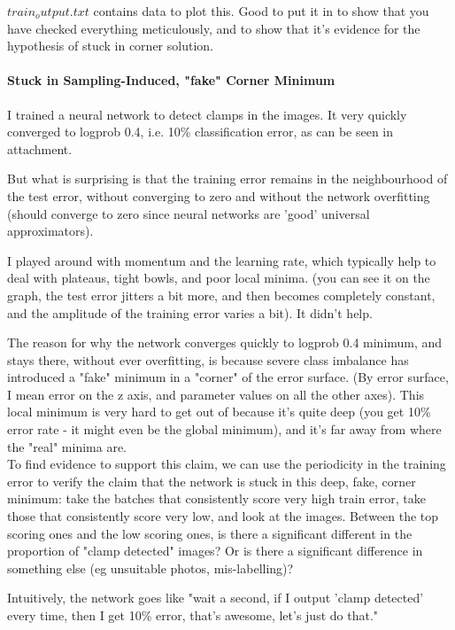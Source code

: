\documentclass[a4paper,11pt]{article}
\begin{document}
$train_output.txt$ contains data to plot this. Good to put it in to show that you have checked everything meticulously, and to show that it's evidence for the hypothesis of stuck in corner solution.


\paragraph{Stuck in Sampling-Induced, "fake" Corner Minimum}

I trained a neural network to detect clamps in the images. It very quickly converged to logprob 0.4, i.e. 10\% classification error, as can be seen in attachment.

But what is surprising is that the training error remains in the neighbourhood of the test error, without converging to zero and without the network overfitting (should converge to zero since neural networks are 'good' universal approximators).

I played around with momentum and the learning rate, which typically help to deal with plateaus, tight bowls, and poor local minima. (you can see it on the graph, the test error jitters a bit more, and then becomes completely constant, and the amplitude of the training error varies a bit). It didn't help.

The reason for why the network converges quickly to logprob 0.4 minimum, and stays there, without ever overfitting, is because severe class imbalance has introduced a "fake" minimum in a "corner" of the error surface. (By error surface, I mean error on the z axis, and parameter values on all the other axes). This local minimum is very hard to get out of because it's quite deep (you get 10\% error rate - it might even be the global minimum), and it's far away from where the "real" minima are. \\

To find evidence to support this claim, we can use the periodicity in the training error to verify the claim that the network is stuck in this deep, fake, corner minimum: take the batches that consistently score very high train error, take those that consistently score very low, and look at the images. Between the top scoring ones and the low scoring ones, is there a significant different in the proportion of "clamp detected" images? Or is there a significant difference in something else (eg unsuitable photos, mis-labelling)?

Intuitively, the network goes like "wait a second, if I output 'clamp detected' every time, then I get 10\% error, that's awesome, let's just do that."
\end{document}
